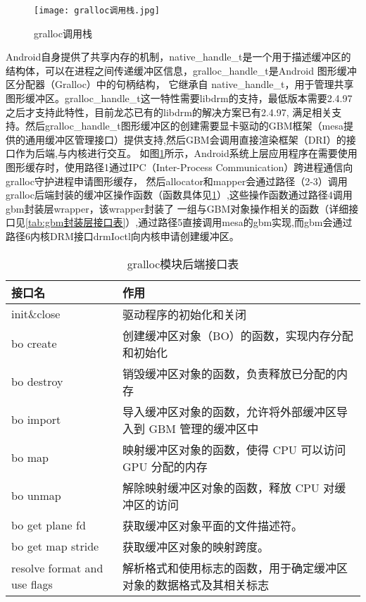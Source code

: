 \begin{figure}[h]
  \centering
  \texttt{[image: gralloc调用栈.jpg]}
  \caption{gralloc调用栈}
  \label{fig:gralloc调用栈}
\end{figure}

Android自身提供了共享内存的机制，native\_handle\_t是一个用于描述缓冲区的结构体，可以在进程之间传递缓冲区信息，gralloc\_handle\_t是Android 图形缓冲区分配器（Gralloc）中的句柄结构，
它继承自 native\_handle\_t，用于管理共享图形缓冲区。gralloc\_handle\_t这一特性需要libdrm的支持，最低版本需要2.4.97之后才支持此特性，目前龙芯已有的libdrm的解决方案已有2.4.97,
满足相关支持。然后gralloc\_handle\_t图形缓冲区的创建需要显卡驱动的GBM框架（mesa提供的通用缓冲区管理接口）提供支持,然后GBM会调用直接渲染框架（DRI）的接口作为后端,与内核进行交互。
如图\ref{fig:gralloc调用栈}所示，Android系统上层应用程序在需要使用图形缓存时，使用路径1通过IPC（Inter-Process Communication）跨进程通信向gralloc守护进程申请图形缓存，
然后allocator和mapper会通过路径（2-3）调用gralloc后端封装的缓冲区操作函数（函数具体见\ref{tab:gralloc模块后端接口表}）,这些操作函数通过路径4调用gbm封装层wrapper，该wrapper封装了
一组与GBM对象操作相关的函数（详细接口见\ref{tab:gbm封装层接口表}）,通过路径5直接调用mesa的gbm实现,而gbm会通过路径6内核DRM接口drmIoctl向内核申请创建缓冲区。

\begin{table}[h]  
  \centering
  \caption{gralloc模块后端接口表}
  \label{tab:gralloc模块后端接口表}
  \begin{tabular}{ll}
    \toprule
    接口名  & 作用\\
    \midrule
    init\&close & 驱动程序的初始化和关闭 \\
    bo create & 创建缓冲区对象（BO）的函数，实现内存分配和初始化 \\
    bo destroy & 销毁缓冲区对象的函数，负责释放已分配的内存 \\
    bo import & 导入缓冲区对象的函数，允许将外部缓冲区导入到 GBM 管理的缓冲区中 \\
    bo map & 映射缓冲区对象的函数，使得 CPU 可以访问 GPU 分配的内存 \\
    bo unmap & 解除映射缓冲区对象的函数，释放 CPU 对缓冲区的访问 \\
    bo get plane fd & 获取缓冲区对象平面的文件描述符。\\
    bo get map stride & 获取缓冲区对象的映射跨度。 \\
    resolve format and use flags & 解析格式和使用标志的函数，用于确定缓冲区对象的数据格式及其相关标志 \\
    \bottomrule
  \end{tabular}
  \note{}
\end{table}

